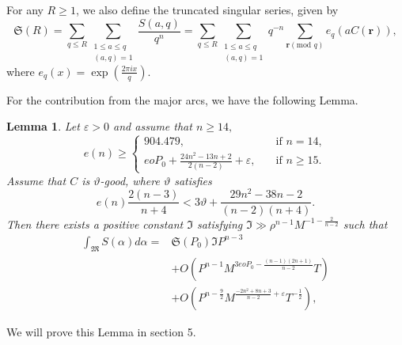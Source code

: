 \documentclass[12pt]{amsart}
\newtheorem{lemma}[theorem]{Lemma}
\theoremstyle{definition}
\numberwithin{equation}{section}
\begin{document}
For any $R \geq 1$, we also define the truncated singular series, given by
\begin{equation}
    \label{singular_series}
    \mathfrak{S}(R)=\sum_{q\leq R}\sum_{\substack{1\leq a\leq q\\[3pt](a,q)=1}} \frac{S(a,q)}{q^{n}}=\sum_{q\leq R}\sum_{\substack{1\leq a\leq q\\[3pt](a,q)=1}} q^{-n}\sum_{\boldsymbol {r}(\text{mod } q)} e_q(aC(\boldsymbol {r})),
\end{equation}
 where $e_q(x)=\exp(\frac{2\pi i x}{q}).$


For the contribution from the major arcs, we have the following Lemma.
\begin{lemma}
    \label{contribution_major}
Let $\varepsilon > 0$ and assume that $n \geq 14,$
\begin{equation}
\label{The child I want to abandon}
    e(n) \geq
    \begin{cases}
    904.479, \quad &\text{if } n =14,\\
    eoP_0+\frac{24n^2-13n+2}{2(n-2)}+\varepsilon, \quad &\text{if }n\geq 15.
    \end{cases}
\end{equation}
Assume that $C$ is $\vartheta$-good, where $\vartheta$ satisfies %
\begin{equation}
    \label{good_demand_1}
    e(n)\frac{2(n-3)}{n+4}< 3\vartheta+\frac{29n^2-38n-2}{(n-2)(n+4)}.
\end{equation}
Then there exists a positive constant $\mathfrak{I}$ satisfying $\mathfrak{I} \gg \rho^{n-1}M^{-1-\frac{2}{n-2}}$ such that
\begin{equation*}
    \begin{split}
        \int_{\mathfrak{M}} S(\alpha) d\alpha=
        &\mathfrak{S}(P_0)\mathfrak{I}P^{n-3}\\
        &+O\left(P^{n-1}M^{3eoP_0-\frac{(n-1)(2n+1)}{n-2}}T\right)\\
        &+O\left(P^{n-\frac{9}{2}}M^{\frac{-2n^2+8n+3}{n-2}+\varepsilon}T^{-\frac{1}{2}}\right),
    \end{split}
\end{equation*}
\end{lemma}
We will prove this Lemma in section 5.
\end{document}
